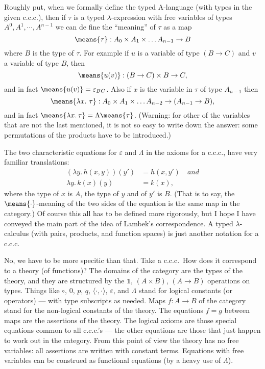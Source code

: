 \documentclass[12pt]{article}
\def\to{\rightarrow}
\def\comp{\circ}
\def\bbone{\mathbb 1}
\def\ccc{{c.c.c.}}
\def\ev{\varepsilon}
\def\ebc{\varepsilon_{BC}}
\def\L{\Lambda}
\def\l{\lambda}
\def\lm#1.#2{\lambda#1.\, #2}
\begin{document}
Roughly put, when we formally define the typed A-language (with types in the given \ccc), then if $\tau$ is a typed $\l$-expression with free variables of types $A^0, A^1,\cdots, A^{n-1}$ we can de fine the ``meaning'' of $\tau$ as a map
%
$$
\means{\tau}: A_0 \times A_1 \times \dots A_{n-1} \to B
$$
%
where $B$ is the type of $\tau$. For example if $u$ is a variable of type $(B \to C)$ and $v$ a variable of type $B$, then
$$
\means{u(v)}: (B \to C) \times B \to C,
$$
%
and in fact $\means{u(v)} = \ebc$. Also if $x$ is the variable in $\tau$ of type $A_{n-1}$ then
$$
\means{\lm{x}.\, \tau}: A_0 \times A_1 \times \dots A_{n-2} \to (A_{n-1} \to B),
$$
%
and in fact $\means{\l x.\, \tau} = \L\means{\tau}$. (Warning: for other of the variables that are not the last mentioned, it is not so easy to write down the answer: some permutations of the products have to be introduced.)

The two characteristic equations for $\ev$ and $\L$ in the axioms for a \ccc, have very familiar translations:
\begin{align*}
( \lm{y}. h(x,y))(y') &= h(x,y') \quad and \\
\lm{y}. k(x)(y) &= k(x),
\end{align*}
%
where the type of $x$ is $A$, the type of $y$ and of $y'$ is $B$. (That is to say, the $\means{\cdot}$-meaning of the two sides of the equation is
the same map in the category.) Of course this all has to be defined more rigorously, but I hope I have conveyed the main part of the idea of Lambek's correspondence. A typed $\l$-calculus (with pairs, products, and function spaces) is just another notation for a {c.c.c}.

No, we have to be more specitic than that. Take a \ccc\ How does it correspond to a theory (of functions)? The domains
of the category are the types of the theory, and they are structured by the $\bbone$, $(A \times B)$, $(A\to B)$ operations on types. Things like $\comp$,
$0$, $p$, $q$, $\langle\cdot,\cdot\rangle$, $\ev$, and $\L$ stand for logical constants (or operators) --- with type subscripts as needed. Maps $f : A\to B$ of the category stand for the non-logical constants of the theory.
The equations $f = g$ between maps are the assertions of the theory. The logical axioms are those special equations common to all \ccc's --- the other equations are those that just happen to work out in the category. From this point of view the theory has no free variables: all assertions are written with constant terms. Equations with free variables can be construed as functional equations (by a heavy use of $\L$).
\end{document}
